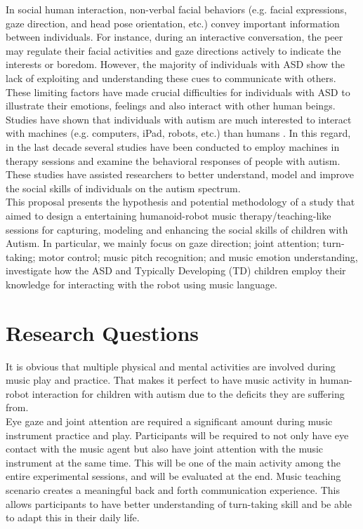 \documentclass[12pt]{report}
\begin{document}
In social human interaction, non-verbal facial behaviors (e.g. facial expressions,
gaze direction, and head pose orientation, etc.) convey important information between
individuals. For instance, during an interactive conversation, the peer may regulate their
facial activities and gaze directions actively to indicate the interests or boredom. However,
the majority of individuals with ASD show the lack of exploiting and understanding these
cues to communicate with others. These limiting factors have made crucial difficulties for
individuals with ASD to illustrate their emotions, feelings and also interact with other
human beings. Studies have shown that individuals with autism are much interested to
interact with machines (e.g. computers, iPad, robots, etc.) than humans \cite{SocialInteract2003}. In this regard,
in the last decade several studies have been conducted to employ machines in therapy
sessions and examine the behavioral responses of people with autism. These studies have
assisted researchers to better understand, model and improve the social skills of individuals
on the autism spectrum.\\

This proposal presents the hypothesis and potential methodology of a study that aimed to design a
entertaining humanoid-robot music therapy/teaching-like sessions for capturing, modeling and 
enhancing the social skills of children with Autism. In particular, we mainly focus on gaze 
direction; joint attention; turn-taking; motor control; music pitch recognition;
and music emotion understanding, investigate how the ASD and Typically Developing (TD) children employ 
their knowledge for interacting with the robot using music language.\\

\section*{Research Questions}
It is obvious that multiple physical and mental activities are involved during music
play and practice. That makes it perfect to have music activity in human-robot interaction for
children with autism due to the deficits they are suffering from. \\

Eye gaze and joint attention are required a significant amount during music instrument practice
and play. Participants will be required to not only have eye contact with the music
agent but also have joint attention with the music instrument at the same time. This will be one of
the main activity among the entire experimental sessions, and will be evaluated at the end.
Music teaching scenario creates a meaningful back and forth communication experience. This allows
participants to have better understanding of turn-taking skill and be able to adapt this 
in their daily life.\\
\end{document}

